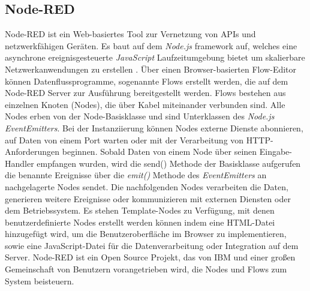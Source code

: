 \documentclass[BMR,Bachelor,ngerman]{twbook}%
\begin{document}
\subsection{Node-RED}
Node-RED ist ein Web-basiertes Tool zur Vernetzung von \acp{API} und netzwerkfähigen Geräten. Es baut auf dem \emph{Node.js} framework auf, welches eine asynchrone ereignisgesteuerte \emph{JavaScript} Laufzeitumgebung bietet um skalierbare Netzwerkanwendungen zu erstellen \cite{nodejs2018}. Über einen Browser-basierten Flow-Editor können Datenflussprogramme, sogenannte Flows erstellt werden, die auf dem Node-RED Server zur Ausführung bereitgestellt werden. Flows bestehen aus einzelnen Knoten (Nodes), die über Kabel miteinander verbunden sind. Alle Nodes erben von der Node-Basisklasse und sind Unterklassen des \emph{Node.js} \emph{EventEmitters}. Bei der Instanziierung können Nodes externe Dienste abonnieren, auf Daten von einem Port warten oder mit der Verarbeitung von \ac{HTTP}-Anforderungen beginnen. Sobald Daten von einem Node über seinen Eingabe-Handler empfangen wurden, wird die send() Methode der Basisklasse aufgerufen die benannte Ereignisse über die \emph{emit()} Methode des \emph{EventEmitters} an nachgelagerte Nodes sendet. Die nachfolgenden Nodes verarbeiten die Daten, generieren weitere Ereignisse oder kommunizieren mit externen Diensten oder dem Betriebssystem. Es stehen Template-Nodes zu Verfügung, mit denen benutzerdefinierte Nodes erstellt werden können indem eine HTML-Datei hinzugefügt wird, um die Benutzeroberfläche im Browser zu implementieren, sowie eine JavaScript-Datei für die Datenverarbeitung oder Integration auf dem Server. Node-RED ist ein Open Source Projekt, das von IBM und einer großen Gemeinschaft von Benutzern vorangetrieben wird, die Nodes und Flows zum System beisteuern. \cite{giang2014toward}
\end{document}
